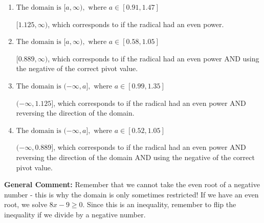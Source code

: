 \documentclass{extbook}[14pt]
\begin{document}
\begin{enumerate}
{\begin{enumerate}[label=\Alph*.]
* This is the correct option since the radical has an odd power.
\item \( \text{The domain is } [a, \infty), \text{   where } a \in [0.91, 1.47] \)

$[1.125, \infty)$, which corresponds to if the radical had an even power.
\item \( \text{The domain is } [a, \infty), \text{   where } a \in [0.58, 1.05] \)

$[0.889, \infty)$, which corresponds to if the radical had an even power AND using the negative of the correct pivot value.
\item \( \text{The domain is } (-\infty, a], \text{   where } a \in [0.99, 1.35] \)

$(-\infty, 1.125]$, which corresponds to if the radical had an even power AND reversing the direction of the domain.
\item \( \text{The domain is } (-\infty, a], \text{   where } a \in [0.52, 1.05] \)

$(-\infty, 0.889]$, which corresponds to if the radical had an even power AND reversing the direction of the domain AND using the negative of the correct pivot value.
\end{enumerate}

\textbf{General Comment:} Remember that we cannot take the even root of a negative number - this is why the domain is only sometimes restricted! If we have an even root, we solve $8 x - 9 \geq 0$. Since this is an inequality, remember to flip the inequality if we divide by a negative number.
}
\end{enumerate}
\end{document}
